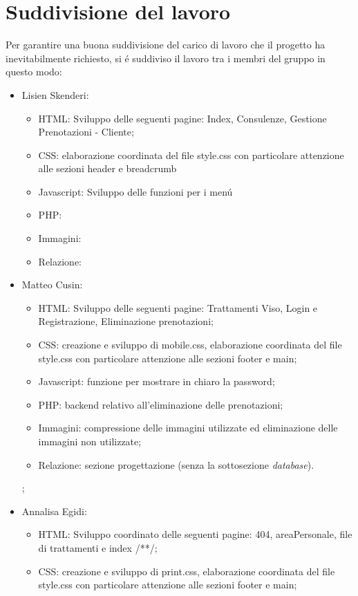 \documentclass[]{article}
\begin{document}
\section{Suddivisione del lavoro}
Per garantire una buona suddivisione del carico di lavoro che il progetto ha inevitabilmente richiesto, si é suddiviso il lavoro tra i membri del gruppo in questo modo:
\begin{itemize}
	\item Lisien Skenderi: 
	\begin{itemize}
		\item HTML: Sviluppo delle seguenti pagine: Index, Consulenze, Gestione Prenotazioni - Cliente;
		\item CSS:  elaborazione coordinata del file style.css con particolare attenzione alle sezioni header e breadcrumb
		\item Javascript: Sviluppo delle funzioni per i menú
		\item PHP:
		\item Immagini:
		\item Relazione:
	\end{itemize}
	\item Matteo Cusin:
	\begin{itemize}
		\item HTML: Sviluppo delle seguenti pagine: Trattamenti Viso, Login e Registrazione, Eliminazione prenotazioni;
		\item CSS: creazione e sviluppo di mobile.css, elaborazione coordinata del file style.css con particolare attenzione alle sezioni footer e main;
		\item Javascript: funzione per mostrare in chiaro la password;
		\item PHP: backend relativo all'eliminazione delle prenotazioni;
		\item Immagini: compressione delle immagini utilizzate ed eliminazione delle immagini non utilizzate;
		\item Relazione: sezione progettazione (senza la sottosezione \textit{database}).
	\end{itemize} ;
	\item Annalisa Egidi:
	\begin{itemize}
		\item HTML: Sviluppo coordinato delle seguenti pagine: 404, areaPersonale, file di trattamenti e index /**/;
		\item CSS: creazione e sviluppo di print.css, elaborazione coordinata del file style.css con particolare attenzione alle sezioni footer e main;

\end{itemize}
\end{itemize}
\end{document}
